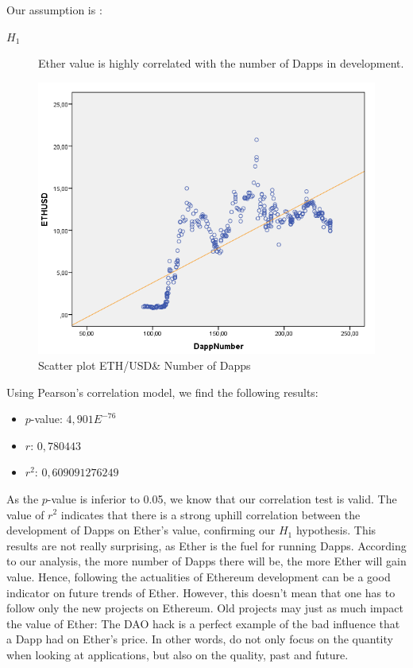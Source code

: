 \documentclass[11pt]{report}
\begin{document}
 Our assumption is :
\begin{description}
\item[$H_1$]Ether value is highly correlated with the number of Dapps in development.
\end{description}
\clearpage
 \begin{figure}[!h]
\centering
\includegraphics[scale=1]{Chap5/ScatterplotETHUSDDAPP}\medbreak
\centering
\caption{Scatter plot ETH/USD\& Number of Dapps}
\label{DAPP}
\end{figure}
\medbreak

Using Pearson's correlation model, we find the following results: 

\begin{itemize}
\item $p$-value: $4,901E^{-76}$
\item $r$: $0,780443$ 
\item $r^2$: $0,609091276249$
\end{itemize}

As the $p$-value is inferior to 0.05, we know that our correlation test is valid. The value of $r^2$ indicates that there is a strong uphill correlation between the development of Dapps on Ether's value, confirming our $H_1$ hypothesis. \newline
This results are not really surprising, as Ether is the fuel for running Dapps. According to our analysis, the more number of Dapps there will be, the more Ether will gain value. Hence, following the actualities of Ethereum development can be a good indicator on future trends of Ether.\newline 
However, this doesn't mean that one has to follow only the new projects on Ethereum. Old projects may just as much impact the value of Ether: The DAO hack is a perfect example of the bad influence that a Dapp had on Ether's price. 
In other words, do not only focus on the quantity when looking at applications, but also on the quality, past and future.
\clearpage	
\end{document}
